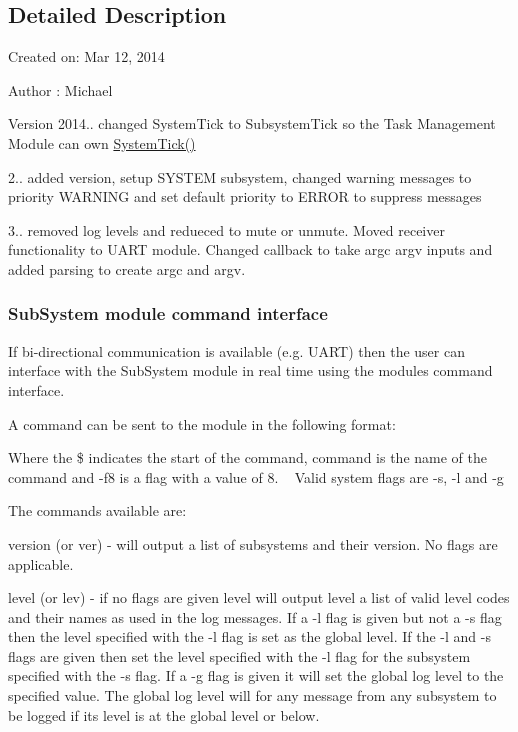 \subsection{Detailed Description}
Created on\+: Mar 12, 2014 \begin{DoxyAuthor}{Author}
\+: Michael
\end{DoxyAuthor}
\begin{DoxyVersion}{Version}
2014.. changed System\+Tick to Subsystem\+Tick so the Task Management Module can own \hyperlink{group__task_gafd2aa563748d1ede229e5867753ead5d}{System\+Tick()} 

2.. added version, setup S\+Y\+S\+T\+E\+M subsystem, changed warning messages to priority W\+A\+R\+N\+I\+N\+G and set default priority to E\+R\+R\+O\+R to suppress messages 

3.. removed log levels and redueced to mute or unmute. Moved receiver functionality to U\+A\+R\+T module. Changed callback to take argc argv inputs and added parsing to create argc and argv. 
\end{DoxyVersion}
\hypertarget{sys_receive}{}\subsubsection{Sub\+System module command interface}\label{sys_receive}
If bi-\/directional communication is available (e.\+g. U\+A\+R\+T) then the user can interface with the Sub\+System module in real time using the module\textquotesingle{}s command interface.

A command can be sent to the module in the following format\+: 
 Where the \$ indicates the start of the command, command is the name of the command and -\/f8 is a flag with a value of 8. ~\newline
Valid system flags are {\ttfamily -\/s}, {\ttfamily -\/l} and {\ttfamily -\/g} 

The commands available are\+:

{\ttfamily version} (or {\ttfamily ver}) -\/ will output a list of subsystems and their version. No flags are applicable.

{\ttfamily level} (or {\ttfamily lev}) -\/ if no flags are given {\ttfamily level} will output level a list of valid level codes and their names as used in the log messages. If a {\ttfamily -\/l} flag is given but not a {\ttfamily -\/s} flag then the level specified with the {\ttfamily -\/l} flag is set as the global level. If the {\ttfamily -\/l} and {\ttfamily -\/s} flags are given then set the level specified with the {\ttfamily -\/l} flag for the subsystem specified with the {\ttfamily -\/s} flag. If a {\ttfamily -\/g} flag is given it will set the global log level to the specified value. The global log level will for any message from any subsystem to be logged if its level is at the global level or below.

